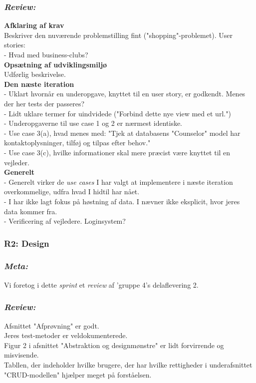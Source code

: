 \documentclass[12pt]{article}
\begin{document}
\subsubsection*{\textit{Review:}}
\textbf{Afklaring af krav} \\
Beskriver den nuværende problemstilling fint ("shopping"{}-problemet).
User stories: \\
- Hvad med business-clubs?\\
\textbf{Opsætning af udviklingsmiljø} \\
Udførlig beskrivelse.\\
\textbf{Den næste iteration} \\
- Uklart hvornår en underopgave, knyttet til en user story, er godkendt. Menes der her tests der passeres? \\
- Lidt uklare termer for uindvidede ("Forbind dette nye view med et url.") \\
- Underopgaverne til use case 1 og 2 er nærmest identiske. \\
- Use case 3(a), hvad menes med: "Tjek at databasens "Counselor" model har \\ kontaktoplysninger, tilføj og tilpas efter behov." \\
- Use case 3(c), hvilke informationer skal mere præcist være knyttet til en vejleder.\\
\textbf{Generelt} \\
- Generelt virker de \textit{use cases} I har valgt at implementere i næste iteration overkommelige, udfra hvad I hidtil har nået. \\
- I har ikke lagt fokus på høstning af data. I nævner ikke eksplicit, hvor jeres data kommer fra. \\
- Verificering af vejledere. Loginsystem?

\subsubsection{R2: Design}
\subsubsection*{\textit{Meta:}}
Vi foretog i dette \textit{sprint} et \textit{review} af 'gruppe 4's delaflevering 2.

\subsubsection*{\textit{Review:}}
Afsnittet "Afprøvning" er godt. \\
Jeres test-metoder er veldokumenterede. \\
Figur 2 i afsnittet "Abstraktion og designmønstre" er lidt forvirrende og misvisende. \\
Tabllen, der indeholder hvilke brugere, der har hvilke rettigheder i underafsnittet "CRUD-modellen" hjælper meget på forståelsen.
\end{document}
